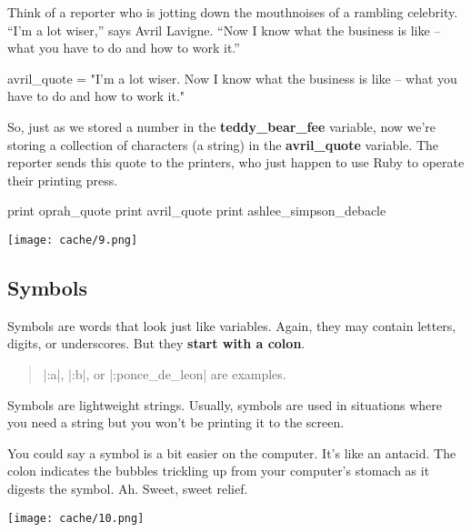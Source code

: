 \documentclass[12pt,twoside]{report}
\begin{document}
Think of a reporter who is jotting down the mouthnoises of a rambling
celebrity.  ``I'm a lot wiser,'' says Avril Lavigne.  ``Now I know
what the business is like -- what you have to do and how to work it.''


\begin{rubycode}
	
 avril_quote = "I'm a lot wiser.  Now I know
   what the business is like -- what you have
   to do and how to work it."

\end{rubycode}


So, just as we stored a number in the {\bf teddy\_bear\_fee} variable,
now we're storing a collection of characters (a string) in the {\bf
  avril\_quote} variable.  The reporter sends this quote to the
printers, who just happen to use Ruby to operate their printing press.


\begin{rubycode}
	
 print oprah_quote
 print avril_quote
 print ashlee_simpson_debacle

\end{rubycode}


	\texttt{[image: cache/9.png]}




\subsection{Symbols}



Symbols are words that look just like variables.  Again, they may
contain letters, digits, or underscores.  But they {\bf start with a
  colon}.

\begin{quote}
\rubyinline|:a|, \rubyinline|:b|, or
\rubyinline|:ponce_de_leon| are examples.\end{quote}


Symbols are lightweight strings.  Usually, symbols are used in
situations where you need a string but you won't be printing it to the
screen.

You could say a symbol is a bit easier on the computer.  It's like an
antacid.  The colon indicates the bubbles trickling up from your
computer's stomach as it digests the symbol.  Ah.  Sweet, sweet
relief.

	\texttt{[image: cache/10.png]}
\end{document}
